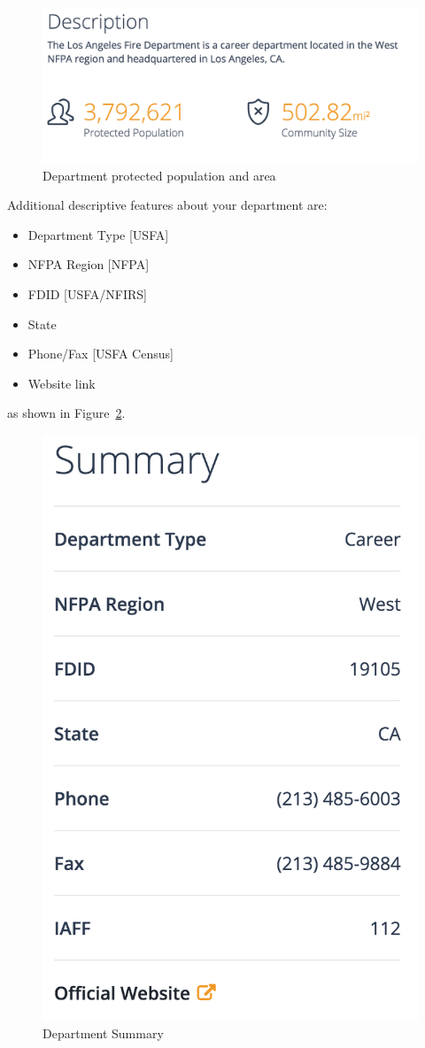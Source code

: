 \documentclass[12pt,oneside]{book}
\begin{document}
\begin{figure}[ht!]
\centering
\includegraphics[width=.9\columnwidth]{Figures/description}
\caption{Department protected population and area}
\label{fig:description}
\end{figure}

\FloatBarrier

Additional descriptive features about your department are:

\begin{itemize}
\item Department Type [USFA]
\item NFPA Region [NFPA]
\item FDID [USFA/NFIRS]
\item State 
\item Phone/Fax [USFA Census]
\item Website link
\end{itemize}

as shown in Figure~\ref{fig:description2}.

\begin{figure}[ht!]
\centering
\includegraphics[width=.5\columnwidth]{Figures/description2}
\caption{Department Summary}
\label{fig:description2}
\end{figure}
\end{document}
